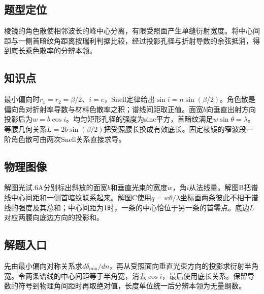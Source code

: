 \documentclass[UTF8,fontset=fandol,a4paper,11pt]{ctexart}
\begin{document}


\subsection*{题型定位}

棱镜的角色散使相邻波长的峰中心分离，有限受照面产生单缝衍射宽度。将中心间距与一侧首暗纹角距离按瑞利判据比较，经过投影孔径与折射导数的余弦抵消，得到底长乘色散率的分辨本领。



\subsection*{知识点}

最小偏向时$r_1=r_2=\beta/2$、$i=e$，Snell定律给出$\sin i=n\sin(\beta/2)$。角色散是偏向角对折射率导数与材料色散率之积；谱线间距取正值。面宽$b$向垂直出射方向投影后为$w=b\cos i$。均匀矩形孔径的强度为sinc平方，首暗纹满足$w\sin\theta=\lambda$。等腰几何关系$L=2b\sin(\beta/2)$把受照腰长换成有效底长。固定棱镜的窄波段一阶角色散可由两次Snell关系直接求导。



\subsection*{物理图像}

解图光试.6A分别标出斜放的面宽$b$和垂直光束的宽度$w$，角$i$从法线量。解图B把谱线中心间距和一侧首暗纹联系起来。解图C使用$q=w\theta/\lambda$坐标画两条彼此不相干谱线的强度及其总和；中心间距为1时，一条的中心恰位于另一条的首零点。底边$L$对应两腰向底边方向的投影和。



\subsection*{解题入口}

先由最小偏向对称关系求$d\delta_{\min}/dn$，再从受照面向垂直光束方向的投影求衍射半角宽。令两条谱线的中心间距等于半角宽，消去$\cos i$，最后使用底长关系。保留导数的符号到物理角间距时再取绝对值，长度单位统一后分辨本领为无量纲数。
\end{document}
